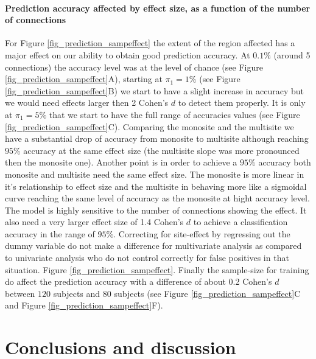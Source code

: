 \documentclass[authoryear]{elsarticle}
\begin{document}
\paragraph{Prediction accuracy affected by effect size, as a function of the number of connections}
For Figure \ref{fig_prediction_sampeffect} the extent of the region affected has a major effect on our ability to obtain good prediction accuracy. At $0.1\%$ (around 5 connections) the accuracy level was at the level of chance (see Figure \ref{fig_prediction_sampeffect}A), starting at $\pi_1=1\%$ (see Figure \ref{fig_prediction_sampeffect}B) we start to have a slight increase in accuracy but we would need effects larger then 2 Cohen's $d$ to detect them properly. It is only at $\pi_1=5\%$ that we start to have the full range of accuracies values (see Figure \ref{fig_prediction_sampeffect}C). Comparing the monosite and the multisite we have a substantial drop of accuracy from monosite to multisite although reaching $95\%$ accuracy at the same effect size (the multisite slope was more pronounced then the monosite one). Another point is in order to achieve a $95\%$ accuracy both monosite and multisite need the same effect size. The monosite is more linear in it's relationship to effect size and the multisite in behaving more like a sigmoidal curve reaching the same level of accuracy as the monosite at hight accuracy level. The model is highly sensitive to the number of connections showing the effect. It also need a very larger effect size of 1.4 Cohen's $d$ to achieve a classification accuracy in the range of $95\%$. Correcting for site-effect by regressing out the dummy variable do not make a difference for multivariate analysis as compared to univariate analysis who do not control correctly for false positives in that situation.
Figure \ref{fig_prediction_sampeffect}. Finally the sample-size for training do affect the prediction accuracy with a difference of about 0.2 Cohen's $d$ between $120$ subjects and $80$ subjects (see Figure \ref{fig_prediction_sampeffect}C and Figure \ref{fig_prediction_sampeffect}F).


\section{Conclusions and discussion}

\end{document}

